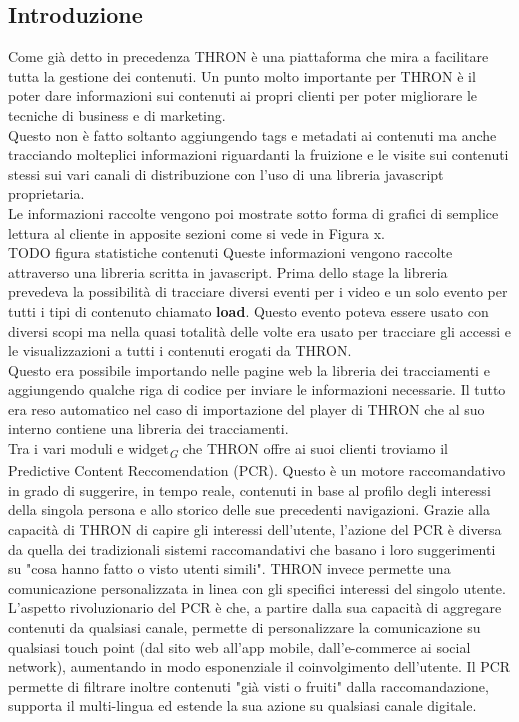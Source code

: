 \documentclass[a4paper, 12pt, twoside, openright]{book}
\newcommand{\gloss}[1]{#1\textsubscript{\textit{\tiny{G}}}}
\begin{document}
\subsection{Introduzione}
Come già detto in precedenza THRON è una piattaforma che mira a facilitare tutta la gestione dei contenuti. Un punto molto importante per THRON è il poter dare informazioni sui contenuti ai propri clienti per poter migliorare le tecniche di business e di marketing.\\Questo non è fatto soltanto aggiungendo tags e metadati ai contenuti ma anche tracciando molteplici informazioni riguardanti la fruizione e le visite sui contenuti stessi sui vari canali di distribuzione con l'uso di una libreria javascript proprietaria.\\Le informazioni raccolte vengono poi mostrate sotto forma di grafici di semplice lettura al cliente in apposite sezioni come si vede in Figura x.\\ TODO figura statistiche contenuti
Queste informazioni vengono raccolte attraverso una libreria scritta in javascript. Prima dello stage la libreria prevedeva la possibilità di tracciare diversi eventi per i video e un solo evento per tutti i tipi di contenuto chiamato \textbf{load}. Questo evento poteva essere usato con diversi scopi ma nella quasi totalità delle volte era usato per tracciare gli accessi e le visualizzazioni a tutti i contenuti erogati da THRON.\\Questo era possibile importando nelle pagine web la libreria dei tracciamenti e aggiungendo qualche riga di codice per inviare le informazioni necessarie. Il tutto era reso automatico nel caso di importazione del player di THRON che al suo interno contiene una libreria dei tracciamenti.\\
Tra i vari moduli e \gloss{widget} che THRON offre ai suoi clienti troviamo il Predictive Content Reccomendation (PCR). Questo è un motore raccomandativo in grado di suggerire, in tempo reale, contenuti in base al profilo degli interessi della singola persona e allo storico delle sue precedenti navigazioni. Grazie alla capacità di THRON di capire gli interessi dell'utente, l'azione del PCR è diversa da quella dei tradizionali sistemi raccomandativi che basano i loro suggerimenti su "cosa hanno fatto o visto utenti simili". THRON invece permette una comunicazione personalizzata in linea con gli specifici interessi del singolo utente. L'aspetto rivoluzionario del PCR è che, a partire dalla sua capacità di aggregare contenuti da qualsiasi canale, permette di personalizzare la comunicazione su qualsiasi touch point (dal sito web all'app mobile, dall'e-commerce ai social network), aumentando in modo esponenziale il coinvolgimento dell'utente. Il PCR permette di filtrare inoltre contenuti "già visti o fruiti" dalla raccomandazione, supporta il multi-lingua ed estende la sua azione su qualsiasi canale digitale.
\end{document}
